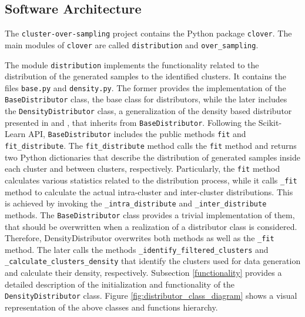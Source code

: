 \documentclass[preprint,12pt, a4paper]{elsarticle}
\begin{document}
\subsection{Software Architecture}
\label{architecture}

The \texttt{cluster-over-sampling} project contains the Python package \texttt{clover}. The main modules of \texttt{clover} are called \texttt{distribution} and \texttt{over\_sampling}. 

The module \texttt{distribution} implements the functionality related to the distribution of the generated samples to the identified clusters. It contains the files \texttt{base.py} and \texttt{density.py}. The former provides the implementation of the \texttt{BaseDistributor} class, the base class for distributors, while the later includes the \texttt{DensityDistributor} class, a generalization of the density based distributor presented in \cite{Douzas2017a} and \cite{Douzas2018}, that inherits from \texttt{BaseDistributor}. Following the Scikit-Learn API, \texttt{BaseDistributor} includes the public methods \texttt{fit} and \texttt{fit\_distribute}. The \texttt{fit\_distribute} method calls the \texttt{fit} method and returns two Python dictionaries that describe the distribution of generated samples inside each cluster and between clusters, respectively. Particularly, the \texttt{fit} method calculates various statistics related to the distribution process, while it calls \texttt{\_fit} method to calculate the actual intra-cluster and inter-cluster distributions. This is achieved by invoking the \texttt{\_intra\_distribute} and \texttt{\_inter\_distribute} methods. The \texttt{BaseDistributor} class provides a trivial implementation of them, that should be overwritten when a realization of a distributor class is considered. Therefore, \texttt{}{DensityDistributor} overwrites both methods as well as the \texttt{\_fit} method. The later calls the methods \texttt{\_identify\_filtered\_clusters} and \texttt{\_calculate\_clusters\_density} that identify the clusters used for data generation and calculate their density, respectively. Subsection \ref{functionality} provides a detailed description of the initialization and functionality of the \texttt{DensityDistributor} class. Figure \ref{fig:distributor_class_diagram} shows a visual representation of the above classes and functions hierarchy.
\end{document}
